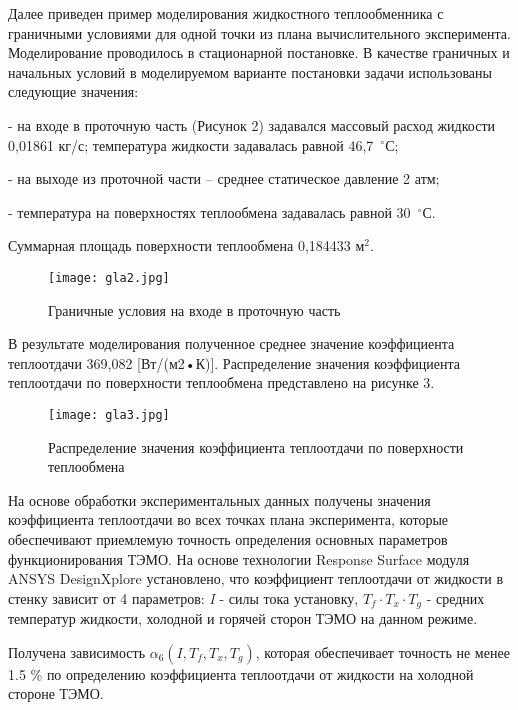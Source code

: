 Далее приведен пример моделирования жидкостного те\-плообменника с граничными условиями
для одной точки из плана вычислительного эксперимента.
Моделирование проводилось в стационарной постановке.
В качестве граничных и начальных условий в моделируемом варианте постановки задачи использованы следующие значения:

- на входе в проточную часть (Рисунок 2) задавался массовый расход жидкости 0,01861 кг/с;
температура жидкости задавалась равной 46,7~$^\circ$С;

- на выходе из проточной части – среднее статическое давление 2 атм;

- температура на поверхностях теплообмена задавалась равной 30~$^\circ$С.

Суммарная площадь поверхности теплообмена 0,184433 м$^2$.

\begin{figure}[h!]
	\centering
	\texttt{[image: gla2.jpg]}
	\caption{Граничные условия на входе в проточную часть}
\end{figure}

В результате моделирования полученное среднее значение коэффициента теплоотдачи 369,082 [Вт/(м2•К)]. Распределение значения коэффициента теплоотдачи по поверхности теплообмена представлено на рисунке 3.

\begin{figure}[h!]
	\centering
	\texttt{[image: gla3.jpg]}
	\caption{Распределение значения коэффициента теплоотдачи по поверхности теплообмена}
\end{figure}


На основе обработки экспериментальных данных получены значения коэффициента теплоотдачи во всех точках плана эксперимента,
которые обеспечивают приемлемую то\-ч\-ность определения основных параметров функционирования ТЭМО.
На основе технологии Response Surface модуля ANSYS DesignXplore установлено,
что коэффициент теплоотдачи от жидкости в стенку зависит от 4 параметров:
\textit{I} - силы тока установку, $T_{f} \cdot T_{x} \cdot T_{g} $ - средних температур жидкости, холодной и горячей сторон ТЭМО на данном режиме.

Получена зависимость $\alpha _{6} (I,T_{f} ,T_{x} ,T_{g} )$, которая обеспечивает точность не менее 1.5 \% по определению коэффициента теплоотдачи от жидкости на холодной стороне ТЭМО.

